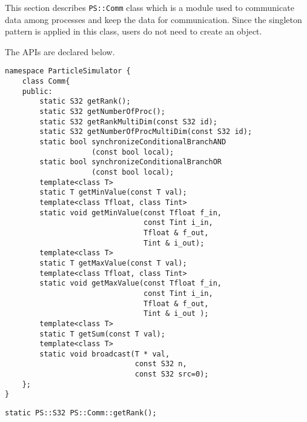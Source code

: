 This section describes {\tt PS::Comm} class which is a module used to
communicate data among processes and keep the data for
communication. Since the singleton pattern is applied in this class,
users do not need to create an object.




The APIs are declared below.

\begin{lstlisting}[caption=Communication]
namespace ParticleSimulator {
    class Comm{
    public:
        static S32 getRank();
        static S32 getNumberOfProc();
        static S32 getRankMultiDim(const S32 id);
        static S32 getNumberOfProcMultiDim(const S32 id);
        static bool synchronizeConditionalBranchAND
                    (const bool local);
        static bool synchronizeConditionalBranchOR
                    (const bool local);
        template<class T>
        static T getMinValue(const T val);
        template<class Tfloat, class Tint>
        static void getMinValue(const Tfloat f_in,
                                const Tint i_in,
                                Tfloat & f_out,
                                Tint & i_out);
        template<class T>
        static T getMaxValue(const T val);
        template<class Tfloat, class Tint>
        static void getMaxValue(const Tfloat f_in,
                                const Tint i_in,
                                Tfloat & f_out,
                                Tint & i_out );
        template<class T>
        static T getSum(const T val);
        template<class T>
        static void broadcast(T * val,
                              const S32 n,
                              const S32 src=0);
    };
}
\end{lstlisting}


\begin{screen}
\begin{verbatim}
static PS::S32 PS::Comm::getRank();
\end{verbatim}
\end{screen}

